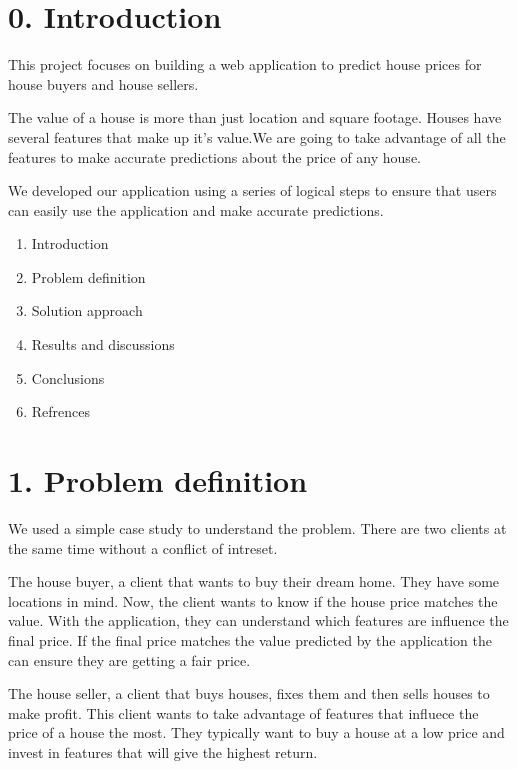 \section{0. Introduction}\label{introduction}

This project focuses on building a web application to predict house
prices for house buyers and house sellers.

The value of a house is more than just location and square footage.
Houses have several features that make up it's value.We are going to
take advantage of all the features to make accurate predictions about
the price of any house.

We developed our application using a series of logical steps to ensure
that users can easily use the application and make accurate predictions.

\begin{enumerate}
\def\labelenumi{\arabic{enumi})}
\setcounter{enumi}{-1}
\itemsep1pt\parskip0pt
\item
  Introduction
\item
  Problem definition
\item
  Solution approach
\item
  Results and discussions
\item
  Conclusions
\item
  Refrences
\end{enumerate}

\section{1. Problem definition}\label{problem-definition}

We used a simple case study to understand the problem. There are two
clients at the same time without a conflict of intreset.

The house buyer, a client that wants to buy their dream home. They have
some locations in mind. Now, the client wants to know if the house price
matches the value. With the application, they can understand which
features are influence the final price. If the final price matches the
value predicted by the application the can ensure they are getting a
fair price.

The house seller, a client that buys houses, fixes them and then sells
houses to make profit. This client wants to take advantage of features
that influece the price of a house the most. They typically want to buy
a house at a low price and invest in features that will give the highest
return.

